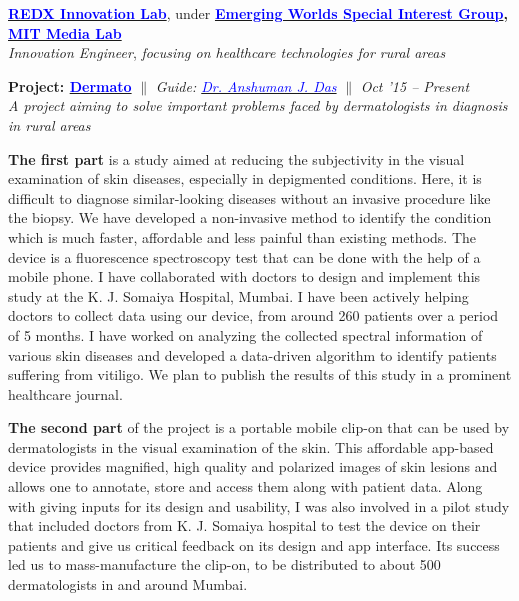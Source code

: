 \documentclass[margin,line]{res}
\newenvironment{list1}{
  \begin{list}{\ding{113}}{%
      \setlength{\itemsep}{0in}
      \setlength{\parsep}{0in} \setlength{\parskip}{0in}
      \setlength{\topsep}{0in} \setlength{\partopsep}{0in}
      \setlength{\leftmargin}{0.17in}}}{\end{list}}
\begin{document}
\begin{resume}
{\bf  \href{http://redxmumbai.com/}{\textcolor{blue}{REDX Innovation Lab}}}, under {\bf \href{http://mitemergingworlds.com/}{\textcolor{blue}{Emerging Worlds Special Interest Group}}, \href{https://www.media.mit.edu}{\textcolor{blue} {MIT Media Lab}}} \\
{\em Innovation Engineer}, {\em focusing on healthcare technologies for rural areas} \\
\vspace*{-.05in}
\begin{list1}
\item[]\textbf{Project: \href{http://dermato.io/}{\textcolor{blue} {Dermato}}} \hfill $\|$ \hfill {\em Guide: \href{http://www.mit.edu/~ajdas}{\textcolor{blue} {Dr. Anshuman J. Das}}} \hfill $\|$ \hfill {\textit{Oct '15 -- Present}} \\
\textit{A project aiming to solve important problems faced by dermatologists in diagnosis in rural areas}
\vspace{4pt}

\noindent \textbf{The first part} is a study aimed at reducing the subjectivity in the visual examination of skin diseases, especially in depigmented conditions. Here, it is difficult to diagnose similar-looking diseases without an invasive procedure like the biopsy. We have developed a non-invasive method to identify the condition which is much faster, affordable and less painful than existing methods. The device is a fluorescence spectroscopy test that can be done with the help of a mobile phone. I have collaborated with doctors to design and implement this study at the K. J. Somaiya Hospital, Mumbai. I have been actively helping doctors to collect data using our device, from around 260 patients over a period of 5 months. I have worked on analyzing the collected spectral information of various skin diseases and developed a data-driven algorithm to identify patients suffering from vitiligo. We plan to publish the results of this study in a prominent healthcare journal.
\vspace{4pt}

\noindent \textbf{The second part} of the project is a portable mobile clip-on that can be used by dermatologists in the visual examination of the skin. This affordable app-based device provides magnified, high quality and polarized images of skin lesions and allows one to annotate, store and access them along with patient data. Along with giving inputs for its design and usability, I was also involved in a pilot study that included doctors from K. J. Somaiya hospital to test the device on their patients and give us critical feedback on its design and app interface. Its success led us to mass-manufacture the clip-on, to be distributed to about 500 dermatologists in and around Mumbai. \\
\vspace*{-.05in}


\end{list1}
\end{resume}
\end{document}
